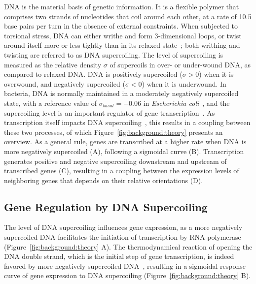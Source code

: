 DNA is the material basis of genetic information.
It is a flexible polymer that comprises two strands of nucleotides that coil around each other, at a rate of 10.5 base pairs per turn in the absence of external constraints.
When subjected to torsional stress, DNA can either writhe and form 3-dimensional loops, or twist around itself more or less tightly than in its relaxed state~\citep{travers2005}; both writhing and twisting are referred to as DNA supercoiling.
The level of supercoiling is measured as the relative density $\sigma$ of supercoils in over- or under-wound DNA, as compared to relaxed DNA.
DNA is positively supercoiled ($\sigma > 0$) when it is overwound, and negatively supercoiled ($\sigma < 0$) when it is underwound.
In bacteria, DNA is normally maintained in a moderately negatively supercoiled state, with a reference value of $\sigma_{basal}=-0.06$ in \emph{Escherichia coli}~\citep{travers2005}, and the supercoiling level is an important regulator of gene transcription~\citep{dorman2016}.
As transcription itself impacts DNA supercoiling~\citep{liu1987}, this results in a coupling between these two processes, of which Figure~\ref{fig:background:theory} presents an overview.
As a general rule, genes are transcribed at a higher rate when DNA is more negatively supercoiled (A), following a sigmoidal curve (B).
Transcription generates positive and negative supercoiling downstream and upstream of transcribed genes (C), resulting in a coupling between the expression levels of neighboring genes that depends on their relative orientations (D).

\subsection{Gene Regulation by DNA Supercoiling}

The level of DNA supercoiling influences gene expression, as a more negatively supercoiled DNA facilitates the initiation of transcription by RNA polymerase (Figure~\ref{fig:background:theory} A).
The thermodynamical reaction of opening the DNA double strand, which is the initial step of gene transcription, is indeed favored by more negatively supercoiled DNA~\citep{elhoudaigui2019}, resulting in a sigmoidal response curve of gene expression to DNA supercoiling (Figure~\ref{fig:background:theory} B).


